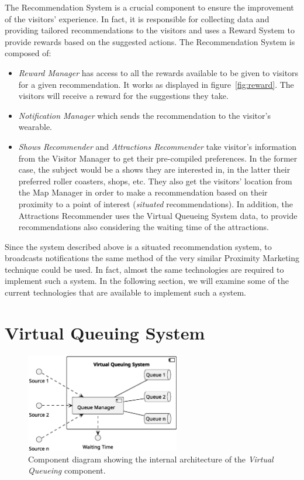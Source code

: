The Recommendation System is a crucial component to ensure the improvement of the visitors' experience. In fact, it is responsible for collecting
data and providing tailored recommendations to the visitors and uses a Reward System to provide rewards based on the suggested actions. The
Recommendation System is composed of:
\begin{itemize}
	\item \textit{Reward Manager} has access to all the rewards available to be given to visitors for a given recommendation. It works as displayed in figure~\ref{fig:reward}.
	      The visitors will receive a reward for the suggestions they take.
	\item \textit{Notification Manager} which sends the recommendation to the visitor's wearable.
	\item \textit{Shows Recommender} and \textit{Attractions Recommender} take visitor's information from the Visitor Manager to get their pre-compiled preferences.
	      In the former case, the subject would be a shows they are interested in, in the latter their preferred roller coasters, shops, etc. They also get the visitors' location from the Map Manager in order to make a recommendation based on their proximity to a point of interest (\textit{situated} recommendations).
	      In addition, the Attractions Recommender uses the Virtual Queueing System data, to provide recommendations also considering the waiting time of the attractions.
\end{itemize}

Since the system described above is a situated recommendation system, to broadcasts notifications the same method of the very similar Proximity
Marketing technique could be used. In fact, almost the same technologies are required to implement such a system. In the following section, we will
examine some of the current technologies that are available to implement such a system.

\section{Virtual Queuing System}
\begin{figure}[H]
	\centering
	\includegraphics[width=0.6\textwidth]{img/virtual-queuing.eps}
	\caption{Component diagram showing the internal architecture of the \textit{Virtual Queueing} component.
	}
	\label{fig:virtual-queueing-arch}
\end{figure}

